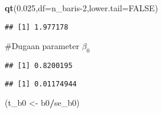 \documentclass[
]{article}
\newenvironment{Shaded}{\begin{snugshade}}{\end{snugshade}}
\newcommand{\AttributeTok}[1]{\textcolor[rgb]{0.13,0.29,0.53}{#1}}
\newcommand{\ConstantTok}[1]{\textcolor[rgb]{0.56,0.35,0.01}{#1}}
\newcommand{\DecValTok}[1]{\textcolor[rgb]{0.00,0.00,0.81}{#1}}
\newcommand{\FloatTok}[1]{\textcolor[rgb]{0.00,0.00,0.81}{#1}}
\newcommand{\FunctionTok}[1]{\textcolor[rgb]{0.13,0.29,0.53}{\textbf{#1}}}
\newcommand{\NormalTok}[1]{#1}
\newcommand{\OtherTok}[1]{\textcolor[rgb]{0.56,0.35,0.01}{#1}}
\newcommand{\SpecialCharTok}[1]{\textcolor[rgb]{0.81,0.36,0.00}{\textbf{#1}}}
\newcommand{\StringTok}[1]{\textcolor[rgb]{0.31,0.60,0.02}{#1}}
\begin{document}
\begin{Shaded}
\begin{Highlighting}[]
\FunctionTok{qt}\NormalTok{(}\FloatTok{0.025}\NormalTok{,}\AttributeTok{df=}\NormalTok{n\_baris}\DecValTok{{-}2}\NormalTok{,}\AttributeTok{lower.tail=}\ConstantTok{FALSE}\NormalTok{)}
\end{Highlighting}
\end{Shaded}

\begin{verbatim}
## [1] 1.977178
\end{verbatim}

\#Dugaan parameter \(\beta_0\)

\begin{Shaded}
\end{Shaded}

\begin{verbatim}
## [1] 0.8200195
\end{verbatim}

\begin{Shaded}
\end{Shaded}

\begin{verbatim}
## [1] 0.01174944
\end{verbatim}

\begin{Shaded}
\begin{Highlighting}[]
\NormalTok{(t\_b0 }\OtherTok{\textless{}{-}}\NormalTok{ b0}\SpecialCharTok{/}\NormalTok{se\_b0)}
\end{Highlighting}
\end{Shaded}
\end{document}
